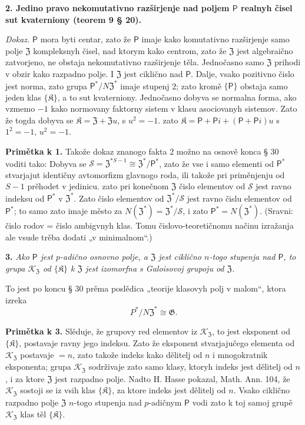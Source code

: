 \documentclass[11pt]{article}
\begin{document}
\noindent\textbf{2. Jedino pravo nekomutativno razširjenje nad poljem \(\mathsf{P}\) realnyh čisel sut kvaterniony (teorem 9 § 20).}

\noindent\emph{Dokaz.} \(\mathsf{P}\) mora byti centar, zato že \(\mathsf{P}\) imaje kako komutativno razširjenje samo polje \(\mathfrak Z\) kompleksnyh čisel, nad ktorym kako centrom, zato že \(\mathfrak Z\) jest algebraično zatvorjeno, ne obstaja nekomutativno razširjenje těla. Jednočasno samo \(\mathfrak Z\) prihodi v obzir kako razpadno polje. I \(\mathfrak Z\) jest ciklično nad \(\mathsf{P}\). Dalje, vsako pozitivno čislo jest norma, zato grupa \(\mathsf{P}^*/N\mathfrak Z^*\) imaje stupenj 2; zato kromě \(\{\mathsf{P}\}\) obstaja samo jeden klas \(\{\mathfrak K\}\), a to sut kvaterniony. Jednočasno dobyva se normalna forma, ako vzmemo \(-1\) kako normovany faktorny sistem v klasu asociovanyh sistemov. Zato že togda dobyva se \(\mathfrak K=\mathfrak Z+\mathfrak Zu\), s \(u^2=-1\). zato \(\mathfrak K=\mathsf P+\mathsf Pi+(\mathsf P+\mathsf Pi)u\) s \(1^2=-1\), \(u^2=-1\).

\noindent\textbf{Primětka k 1.} Takože dokaz znanogo fakta 2 možno na osnově konca § 30 voditi tako: Dobyva se \(\mathscr S=\mathfrak Z^{*S-1}\cong\mathfrak Z^*/\mathsf{P}^*\), zato že vse i samo elementi od \(\mathsf{P}^*\) stvarjajut identičny avtomorfizm glavnogo roda, ili takože pri priměnjenju od \(S-1\) prěhodet v jedinicu. zato pri konečnom \(\mathfrak Z\) čislo elementov od \(\mathscr S\) jest ravno indeksu od \(\mathsf{P}^*\) v \(\mathfrak Z^*\). Zato čislo elementov od \(\mathfrak Z^*/\mathscr S\) jest ravno čislu elementov od \(\mathsf{P}^*\); to samo zato imaje město za \(N(\mathfrak Z^*)=\mathfrak Z^*/\mathscr S\), i zato \(\mathsf{P}^*=N(\mathfrak Z^*)\). (Sravni: čislo rodov = čislo ambigvnyh klas. Tomu čislovo-teoretičnomu načinu izražanja ale vsude trěba dodati „v minimalnom“.)

\noindent\textbf{3.} \emph{Ako \(\mathsf{P}\) jest \(p\)-adično osnovno polje, a \(\mathfrak Z\) jest ciklično \(n\)-togo stupenja nad \(\mathsf{P}\), to grupa \(\mathscr K_{\mathfrak Z}\) od \(\{\mathfrak K\}\) k \(\mathfrak Z\) jest izomorfna s Galoisovoj grupoju od \(\mathfrak Z\).}

To jest po koncu § 30 prěma poslědica „teorije klasovyh polj v malom“, ktora izreka
\[
P^*/N\mathfrak Z^*\cong\mathfrak G.
\]

\noindent\textbf{Primětka k 3.} Slěduje, že grupovy red elementov iz \(\mathscr K_{\mathfrak Z}\), to jest eksponent od \(\{\mathfrak K\}\), postavaje ravny jego indeksu. Zato že eksponent stvarjajučego elementa od \(\mathscr K_{\mathfrak Z}\) postavaje \(=n\), zato takože indeks kako dělitelj od \(n\) i mnogokratnik eksponenta; grupa \(\mathscr K_{\mathfrak Z}\) sodrživaje zato samo klasy, ktoryh indeks jest dělitelj od \(n\), i za ktore \(\mathfrak Z\) jest razpadno polje. Nadto H. Hasse pokazal, Math. Ann. 104, že \(\mathscr K_{\mathfrak Z}\) sostoji se iz vsih klas \(\{\mathfrak K\}\), za ktore indeks jest dělitelj od \(n\). Vsako ciklično razpadno polje \(\mathfrak Z\) \(n\)-togo stupenja nad \(p\)-adičnym \(\mathsf{P}\) vodi zato k toj samoj grupě \(\mathscr K_{\mathfrak Z}\) klas těl \(\{\mathfrak K\}\).
\end{document}
